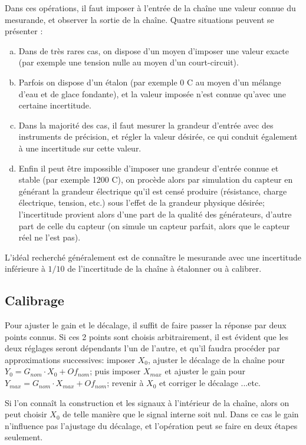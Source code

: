 Dans ces opérations, il faut imposer à l'entrée de la chaîne une valeur connue du mesurande, et observer la sortie de la chaîne. Quatre situations peuvent se présenter :
\begin{enumerate}[a)]
    \item Dans de très rares cas, on dispose d'un moyen d'imposer une valeur exacte (par exemple une tension nulle au moyen d'un court-circuit).
    \item Parfois on dispose d'un étalon (par exemple 0 \degree C au moyen d'un mélange d'eau et de glace fondante), et la valeur imposée n'est connue qu'avec une certaine incertitude.
    \item Dans la majorité des cas, il faut mesurer la grandeur d'entrée avec des instruments de précision, et  régler la valeur désirée, ce qui conduit également à une incertitude sur cette valeur.
    \item Enfin il peut être impossible d'imposer une grandeur d'entrée connue et stable (par exemple 1200 \degree C), on procède alors par simulation du capteur en générant la grandeur électrique qu'il est censé produire (résistance, charge électrique, tension, etc.) sous l'effet de la grandeur physique désirée; l'incertitude provient alors d'une part de la qualité des générateurs, d'autre part de celle du capteur (on simule un capteur parfait, alors que le capteur réel ne l'est pas).
\end{enumerate}
L'idéal recherché généralement est de connaître le mesurande avec une incertitude inférieure à $1/10$ de l'incertitude de la chaîne à étalonner ou à calibrer.

\subsection{Calibrage}

Pour ajuster le gain et le décalage, il suffit de faire passer la réponse par deux points connus. Si ces 2 points sont choisis arbitrairement, il est évident que les deux réglages seront dépendants l'un de l'autre, et qu'il faudra procéder par approximations successives: imposer $X_{0}$, ajuster le décalage de la chaîne pour $Y_{0} = G_{nom} \cdot X_{0} + Of_{nom}$; puis imposer $X_{max}$ et ajuster le gain pour $Y_{max} = G_{nom} \cdot X_{max} + Of_{nom}$; revenir à $X_{0}$ et corriger le décalage ...etc.

Si l'on connaît la construction et les signaux à l'intérieur de la chaîne, alors on peut choisir $X_{0}$ de telle manière que le signal interne soit nul. Dans ce cas le gain n'influence pas l'ajustage du décalage, et l'opération peut se faire en deux étapes seulement.

